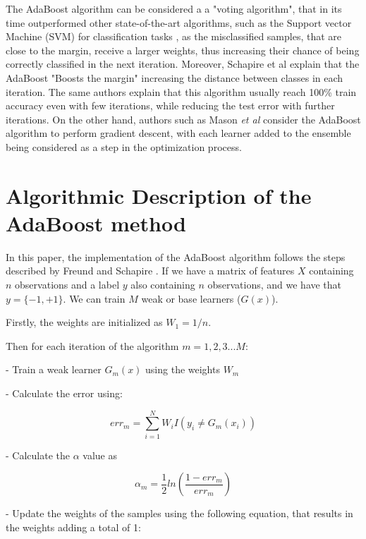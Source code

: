\documentclass[11pt,twocolumn,letterpaper]{article}
\begin{document}
The AdaBoost algorithm can be considered a a "voting algorithm", that in its time outperformed other state-of-the-art algorithms, such as the Support vector Machine (SVM) for classification tasks \cite{Schapire1998}, as the misclassified samples, that are close to the margin, receive a larger weights, thus increasing their chance of being correctly classified in the next iteration. Moreover, Schapire et al \cite{Schapire1998} explain that the AdaBoost "Boosts the margin" increasing the distance between classes in each iteration. The same authors explain that this algorithm usually reach 100\% train accuracy even with few iterations, while reducing the test error with further iterations. On the other hand, authors such as Mason \textit{et al} \cite{Mason2000} consider the AdaBoost algorithm to perform gradient descent, with each learner added to the ensemble being considered as a step in the optimization process.



\section{Algorithmic Description of the AdaBoost method}

In this paper, the implementation of the AdaBoost algorithm follows the steps described by Freund and Schapire \cite{Freund1999}. If we have a matrix of features $X$ containing $n$ observations and a label $y$ also containing $n$ observations, and we have that $y = \{-1,+1\}$. We can train $M$ weak or base learners ($G(x)$).

Firstly, the weights are initialized as $W_1 = 1/n$. 

Then for each iteration of the algorithm $m = 1,2,3...M$:

- Train a weak learner $G_m(x)$ using the weights $W_m$

- Calculate the error using:

\begin{equation}
	err_m = \sum_{i=1}^{N} W_i I(y_i \neq G_m(x_i))
\end{equation}

- Calculate the $\alpha$ value as

\begin{equation}
	\alpha_m = \frac{1}{2}ln(\frac{1-err_m}{err_m})
\end{equation}

- Update the weights of the samples using the following equation, that results in the weights adding a total of 1:
\end{document}
